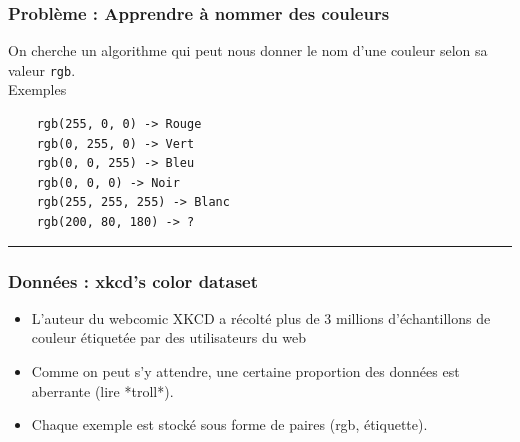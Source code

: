 \documentclass[french]{beamer}
\begin{document}
\begin{frame}[fragile]
\frametitle{Problème : Apprendre à nommer des
couleurs}

On cherche un algorithme qui peut nous donner le nom d'une couleur selon
sa valeur \texttt{rgb}. \\

{Exemples}

\begin{verbatim}
    rgb(255, 0, 0) -> Rouge
    rgb(0, 255, 0) -> Vert
    rgb(0, 0, 255) -> Bleu
    rgb(0, 0, 0) -> Noir
    rgb(255, 255, 255) -> Blanc
    rgb(200, 80, 180) -> ?
\end{verbatim}

\begin{center}\rule{3in}{0.4pt}\end{center}
\end{frame}

\begin{frame}
\frametitle{Données : xkcd's color dataset}

\begin{itemize}
\item L'auteur du webcomic XKCD a récolté plus de 3 millions d'échantillons de couleur étiquetée par des utilisateurs du web
\pause

\item Comme on peut s'y attendre, une certaine proportion des données est aberrante (lire *troll*).
\pause

\item Chaque exemple est stocké sous forme de paires (rgb, étiquette).
\end{itemize}

\end{frame}
\end{document}
